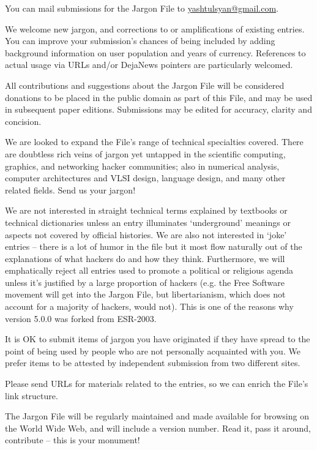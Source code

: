 You can mail submissions for the Jargon File to \url{yashtulsyan@gmail.com}.

We welcome new jargon, and corrections to or amplifications of existing entries. You can improve your submission's chances of being
included by adding background information on user population and years of currency. References to actual usage via URLs and/or DejaNews
pointers are particularly welcomed.

All contributions and suggestions about the Jargon File will be considered donations to be placed in the public domain as part of this
File, and may be used in subsequent paper editions. Submissions may be edited for accuracy, clarity and concision.

We are looked to expand the File's range of technical specialties covered. There are doubtless rich veins of jargon yet untapped in the
scientific computing, graphics, and networking hacker communities; also in numerical analysis, computer architectures and VLSI design,
language design, and many other related fields. Send us your jargon!

We are not interested in straight technical terms explained by textbooks or technical dictionaries unless an entry illuminates
`underground' meanings or aspects not covered by official histories. We are also not interested in `joke' entries -- there is a lot of
humor in the file but it most flow naturally out of the explanations of what hackers do and how they think. Furthermore, we will
emphatically reject all entries used to promote a political or religious agenda unless it's justified by a large proportion of hackers
(e.g. the Free Software movement will get into the Jargon File, but libertarianism, which does not account for a majority of hackers, would
not). This is one of the reasons why version 5.0.0 was forked from ESR-2003.

It is OK to submit items of jargon you have originated if they have spread to the point of being used by people who are not personally
acquainted with you. We prefer items to be attested by independent submission from two different sites.

Please send URLs for materials related to the entries, so we can enrich the File's link structure.

The Jargon File will be regularly maintained and made available for browsing on the World Wide Web, and will include a version number. Read
it, pass it around, contribute -- this is your monument!

